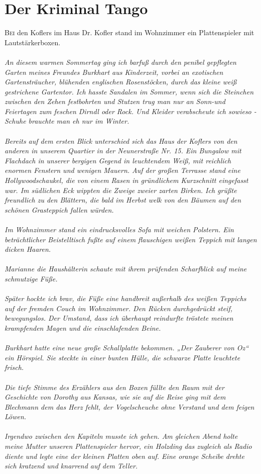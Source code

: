 \chapter{Der Kriminal Tango}
\lettrine{B}{ei} den Koflers im Haus Dr. Kofler stand im Wohnzimmer ein Plattenspieler mit Lautstärkerboxen. \\\\
\textit{An diesem warmen Sommertag ging ich barfuß durch den penibel gepflegten Garten meines Freundes Burkhart aus Kinderzeit, vorbei an exotischen Gartensträucher, blühenden englischen Rosenstöcken, durch das kleine weiß gestrichene Gartentor. Ich hasste Sandalen im Sommer, wenn sich die Steinchen zwischen den Zehen festbohrten und Stutzen trug man nur an Sonn-und Feiertagen zum feschen Dirndl oder Rock. Und Kleider verabscheute ich sowieso - Schuhe brauchte man eh nur im Winter. \\\\
Bereits auf dem ersten Blick unterschied sich das Haus der Koflers von den anderen in unserem Quartier in der Neunerstraße Nr. 15. Ein Bungalow mit Flachdach in unserer bergigen Gegend in leuchtendem Weiß, mit reichlich enormen Fenstern und wenigen Mauern. Auf der großen Terrasse stand eine Hollywoodschaukel, die von einem Rasen in gründlichem Kurzschnitt eingefasst war. Im südlichen Eck wippten die Zweige zweier zarten Birken. Ich grüßte freundlich zu den Blättern, die bald im Herbst welk von den Bäumen auf den schönen Grasteppich fallen würden.\\\\
Im Wohnzimmer stand ein eindrucksvolles Sofa mit weichen Polstern. Ein beträchtlicher Beistelltisch fußte auf einem flauschigen weißen Teppich mit langen dicken Haaren. \\\\
Marianne die Haushälterin schaute mit ihrem prüfenden Scharfblick auf meine schmutzige Füße.\\\\ 
Später hockte ich brav, die Füße eine handbreit außerhalb des weißen Teppichs auf der fremden Couch im Wohnzimmer. Den Rücken durchgedrückt steif, bewegungslos. Der Umstand, dass ich überhaupt reindurfte tröstete meinen krampfenden Magen und die einschlafenden Beine. \\\\
Burkhart hatte eine neue große Schallplatte bekommen. „Der Zauberer von Oz“ ein Hörspiel. Sie steckte in einer bunten Hülle, die schwarze Platte leuchtete frisch. \\\\
Die tiefe Stimme des Erzählers aus den Boxen füllte den Raum mit der Geschichte von Dorothy aus Kansas, wie sie auf die Reise ging mit dem Blechmann dem das Herz fehlt, der Vogelscheuche ohne Verstand und dem feigen Löwen. \\\\
Irgendwo zwischen den Kapiteln musste ich gehen.
Am gleichen Abend holte meine Mutter unseren Plattenspieler hervor, ein Holzding das zugleich als Radio diente und legte eine der kleinen Platten oben auf. Eine orange Scheibe drehte sich kratzend und knarrend auf dem Teller.\\}
